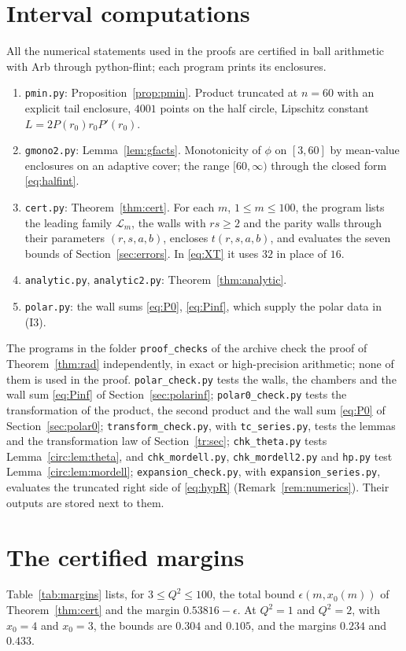\section{Interval computations}\label{app:interval}

All the numerical statements used in the proofs are certified in ball arithmetic with Arb \cite{Joh17} through python-flint; each program prints its enclosures.
\begin{enumerate}
\item[(I1)] \texttt{pmin.py}: Proposition~\ref{prop:pmin}. Product truncated at $n=60$ with an explicit tail enclosure, $4001$ points on the half circle, Lipschitz constant $L=2P(r_0)r_0P'(r_0)$.
\item[(I2)] \texttt{gmono2.py}: Lemma~\ref{lem:gfacts}. Monotonicity of $\phi$ on $[3,60]$ by mean-value enclosures on an adaptive cover; the range $[60,\infty)$ through the closed form \eqref{eq:halfint}.
\item[(I3)] \texttt{cert.py}: Theorem~\ref{thm:cert}. For each $m$, $1\le m\le100$, the program lists the leading family $\mathcal L_m$, the walls with $rs\ge2$ and the parity walls through their parameters $(r,s,a,b)$, encloses $t(r,s,a,b)$, and evaluates the seven bounds of Section~\ref{sec:errors}. In \eqref{eq:XT} it uses $32$ in place of $16$.
\item[(I4)] \texttt{analytic.py}, \texttt{analytic2.py}: Theorem~\ref{thm:analytic}.
\item[(I5)] \texttt{polar.py}: the wall sums \eqref{eq:P0}, \eqref{eq:Pinf}, which supply the polar data in (I3).
\end{enumerate}
The programs in the folder \texttt{proof\_checks} of the archive check the proof of Theorem~\ref{thm:rad} independently, in exact or high-precision arithmetic; none of them is used in the proof. \texttt{polar\_check.py} tests the walls, the chambers and the wall sum \eqref{eq:Pinf} of Section~\ref{sec:polarinf}; \texttt{polar0\_check.py} tests the transformation of the product, the second product and the wall sum \eqref{eq:P0} of Section~\ref{sec:polar0}; \texttt{transform\_check.py}, with \texttt{tc\_series.py}, tests the lemmas and the transformation law of Section~\ref{tr:sec}; \texttt{chk\_theta.py} tests Lemma~\ref{circ:lem:theta}, and \texttt{chk\_mordell.py}, \texttt{chk\_mordell2.py} and \texttt{hp.py} test Lemma~\ref{circ:lem:mordell}; \texttt{expansion\_check.py}, with \texttt{expansion\_series.py}, evaluates the truncated right side of \eqref{eq:hypR} (Remark~\ref{rem:numerics}). Their outputs are stored next to them.

\section{The certified margins}\label{app:margins}

Table~\ref{tab:margins} lists, for $3\le Q^2\le100$, the total bound $\epsilon(m,x_0(m))$ of Theorem~\ref{thm:cert} and the margin $0.53816-\epsilon$. At $Q^2=1$ and $Q^2=2$, with $x_0=4$ and $x_0=3$, the bounds are $0.304$ and $0.105$, and the margins $0.234$ and $0.433$.


